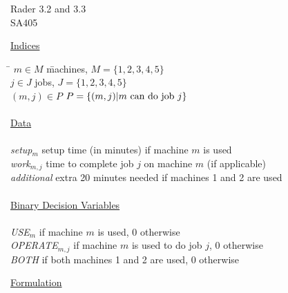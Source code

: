 \documentclass[10pt]{article}
\begin{document}
\begin{center}
  {\sc Rader 3.2 and 3.3}\\
  {\sc SA405} \\
\end{center}

\medskip



\noindent\underline{Indices}
\begin{tabbing}
\hspace{.5cm} \= $m\in M$ \hspace{2.5cm} \= machines, $M=\{1,2,3,4,5\}$ \\
\> $j\in J$ \> jobs, $J=\{1,2,3,4,5\}$\\
\> $(m,j)\in P$ \> $P=\{(m,j)|m~{\rm can~do~job}~j\}$ \\

\\
\noindent\underline{Data}\\%
\\
\> {\it setup}$_{m}$ \> setup time (in minutes) if machine $m$ is used\\
\> {\it work}$_{m,j}$ \> time to complete job $j$ on machine $m$ (if applicable) \\
\> {\it additional} \> extra 20 minutes needed if machines 1 and 2 are used \\
\\

\noindent\underline{Binary Decision Variables}\\%
\\
\> {\it USE}$_m$  if machine $m$ is used, 0 otherwise  \\
\> {\it OPERATE}$_{m,j}$  if machine $m$ is used to do job $j$, 0 otherwise \\
\> {\it BOTH}  if both machines 1 and 2 are used, 0 otherwise\\
\end{tabbing}


\noindent\underline{Formulation}
\end{document}
